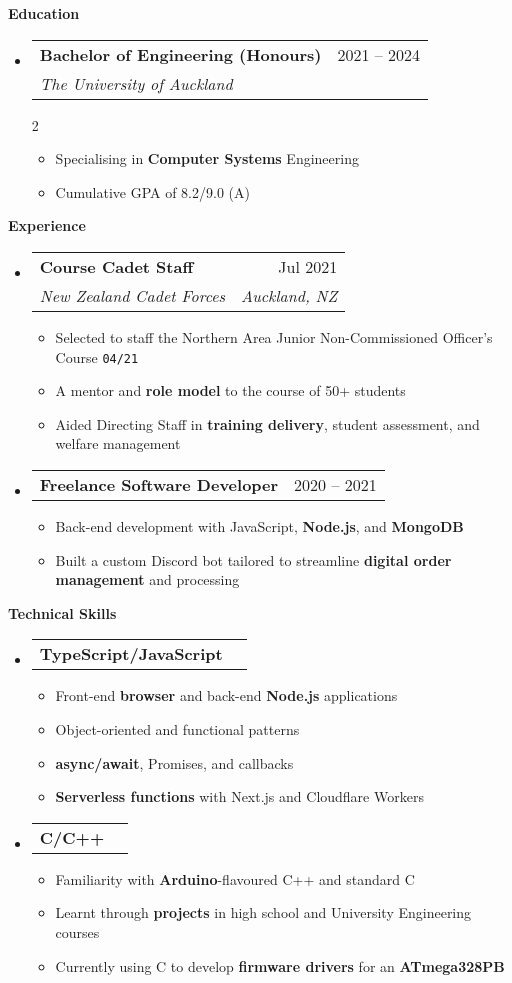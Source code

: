\documentclass[11pt,a4paper]{article}[leftmargin=*]
\makeatletter
\def \entryspacing {-0pt}
\renewcommand{\section}[2]{\vspace{5pt}
  \colorbox{secondary}{\color{white}\raggedbottom\normalsize\textbf{{#1}{\hspace{2pt}#2}}}
}
\newcommand{\resumeEntryStart}{\begin{itemize}[leftmargin=2.5mm]}
\newcommand{\resumeEntryEnd}{\end{itemize}\vspace{\entryspacing}}
\newcommand{\resumeItemListStart}{\begin{itemize}[leftmargin=4.5mm]}
\newcommand{\resumeItemListEnd}{\end{itemize}}
\newcommand{\resumeItemListStartColumns}[2][-0.5]{\vspace*{#1\multicolsep}
\begin{multicols}{#2}\begin{itemize}[leftmargin=4.5mm]}
\newcommand{\resumeItemListEndColumns}[1][-0.5]{\end{itemize}\end{multicols}\vspace*{#1\multicolsep}}
\newcommand{\resumeItem}[1]{
  \item\small{
    {#1 \vspace{-2pt}}
  }
}
\newcommand{\resumeEntryTSDL}[4]{
  \vspace{-1pt}\item[]
    \begin{tabularx}{0.97\textwidth}{X@{\hspace{60pt}}r}
      \textbf{\color{primary}#1} & {\firabook\color{accent}\small#2} \\
      \textit{\color{accent}\small#3} & \textit{\color{accent}\small#4} \\
    \end{tabularx}\vspace{-6pt}
}
\newcommand{\resumeEntryTD}[2]{
  \vspace{-1pt}\item[]
    \begin{tabularx}{0.97\textwidth}{X@{\hspace{60pt}}r}
      \textbf{\color{primary}#1} & {\firabook\color{accent}\small#2} \\
    \end{tabularx}\vspace{-6pt}
}
\newcommand{\resumeBf}[1]{\small\textbf{\color{halfbold}#1}}
\makeatother
\begin{document}
\section{\faGraduationCap}{Education}

\resumeEntryStart
\resumeEntryTSDL
{Bachelor of Engineering (Honours)}{2021 -- 2024}
{The University of Auckland}{}
\resumeItemListStartColumns[0.5]{2}
\resumeItem {Specialising in \resumeBf{Computer Systems} Engineering}
\resumeItem {Cumulative GPA of 8.2/9.0 (A)}
\resumeItemListEndColumns
\resumeEntryEnd


\section{\faBriefcase}{Experience}

\resumeEntryStart
\resumeEntryTSDL
{Course Cadet Staff}{Jul 2021}
{New Zealand Cadet Forces}{Auckland, NZ}

\resumeItemListStart
\resumeItem {Selected to staff the Northern Area Junior Non-Commissioned Officer's Course \texttt{04/21}}
\resumeItem {A mentor and \resumeBf{role model} to the course of 50+ students}
\resumeItem {Aided Directing Staff in \resumeBf{training delivery}, student assessment, and welfare management}
\resumeItemListEnd
\resumeEntryEnd

\resumeEntryStart
\resumeEntryTD
{Freelance Software Developer}{2020 -- 2021}
\resumeItemListStart
\resumeItem {Back-end development with JavaScript, \resumeBf{Node.js}, and \resumeBf{MongoDB}}
\resumeItem {Built a custom Discord bot tailored to streamline \resumeBf{digital order management} and processing}
\resumeItemListEnd
\resumeEntryEnd


\section{\faCogs}{Technical Skills}

\resumeEntryStart
\resumeEntryTD
{TypeScript/JavaScript}{}
\resumeItemListStart
\resumeItem {Front-end \resumeBf{browser} and back-end \resumeBf{Node.js} applications}
\resumeItem {Object-oriented and functional patterns}
\resumeItem {\resumeBf{async/await}, Promises, and callbacks}
\resumeItem {\resumeBf{Serverless functions} with Next.js and Cloudflare Workers}
\resumeItemListEnd
\resumeEntryEnd

\resumeEntryStart
\resumeEntryTD
{C/C++}{}
\resumeItemListStart
\resumeItem {Familiarity with \resumeBf{Arduino}-flavoured C++ and standard C}
\resumeItem {Learnt through \resumeBf{projects} in high school and University Engineering courses}
\resumeItem {Currently using C to develop \resumeBf{firmware drivers} for an \resumeBf{ATmega328PB}}
\resumeItemListEnd
\resumeEntryEnd
\end{document}
